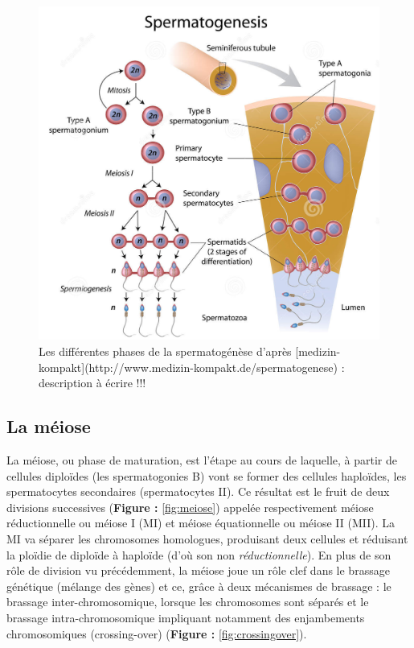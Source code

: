 \documentclass[12pt,twoside]{reedthesis}
\theoremstyle{definition}
\theoremstyle{definition}
\theoremstyle{remark}
\begin{document}
  \begin{figure}
  
  {\centering \includegraphics[scale=0.35]{figure/spermatogenese2} 
  
  }
  
  \caption{Les différentes phases de la spermatogénèse d'après [medizin-kompakt](http://www.medizin-kompakt.de/spermatogenese) : description à écrire !!!}\label{fig:spermatogenese}
  \end{figure}
  
  \hypertarget{meiose}{\subsection{La méiose}\label{meiose}}
  
  La méiose, ou phase de maturation, est l'étape au cours de laquelle, à
  partir de cellules diploïdes (les spermatogonies B) vont se former des
  cellules haploïdes, les spermatocytes secondaires (spermatocytes II). Ce
  résultat est le fruit de deux divisions successives (\textbf{Figure :
  }\ref{fig:meiose}) appelée respectivement méiose réductionnelle ou
  méiose I (MI) et méiose équationnelle ou méiose II (MII). La MI va
  séparer les chromosomes homologues, produisant deux cellules et
  réduisant la ploïdie de diploïde à haploïde (d'où son non
  \emph{réductionnelle}). En plus de son rôle de division vu précédemment,
  la méiose joue un rôle clef dans le brassage génétique (mélange des
  gènes) et ce, grâce à deux mécanismes de brassage : le brassage
  inter-chromosomique, lorsque les chromosomes sont séparés et le brassage
  intra-chromosomique impliquant notamment des enjambements chromosomiques
  (crossing-over) (\textbf{Figure : }\ref{fig:crossingover}).
  
\end{document}
